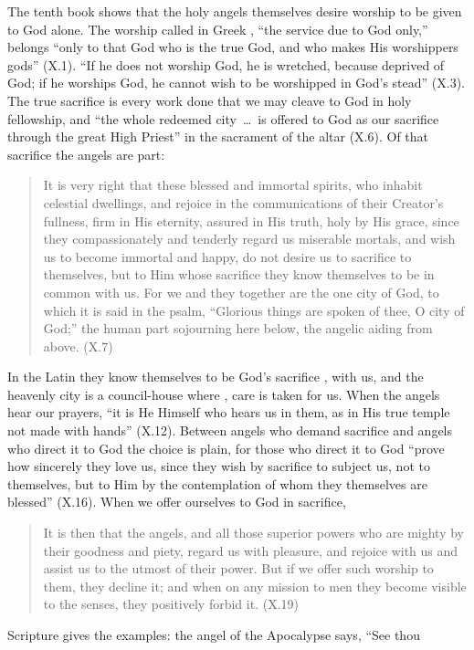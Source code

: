The tenth book shows that the holy angels themselves desire worship to be
given to God alone. The worship called in Greek , ``the
service due to God only,'' belongs ``only to that God who is the true God,
and who makes His worshippers gods'' (X.1). ``If he does not
worship God, he is wretched, because deprived of God; if he worships God,
he cannot wish to be worshipped in God's stead'' (X.3). The true
sacrifice is every work done that we may cleave to God in holy
fellowship, and ``the whole redeemed city~\dots\ is offered to God as our
sacrifice through the great High Priest'' in the sacrament of the altar
(X.6). Of that sacrifice the angels are part:
\begin{quote}
It is very right that these blessed and immortal spirits, who inhabit
celestial dwellings, and rejoice in the communications of their Creator's
fullness, firm in His eternity, assured in His truth, holy by His grace,
since they compassionately and tenderly regard us miserable mortals, and
wish us to become immortal and happy, do not desire us to sacrifice to
themselves, but to Him whose sacrifice they know themselves to be in
common with us. For we and they together are the one city of God, to which
it is said in the psalm, ``Glorious things are spoken of thee, O city of
God;'' the human part sojourning here below, the angelic aiding from
above. (X.7)
\end{quote}
In the Latin they know themselves to be God's sacrifice ,
with us, and the heavenly city is a council-house where , care is taken for us. When the angels hear our
prayers, ``it is He Himself who hears us in them, as in His true temple
not made with hands'' (X.12). Between angels who demand sacrifice and
angels who direct it to God the choice is plain, for those who direct it
to God ``prove how sincerely they love us, since they wish by sacrifice to
subject us, not to themselves, but to Him by the contemplation of whom
they themselves are blessed'' (X.16). When we offer
ourselves to God in sacrifice,
\begin{quote}
It is then that the angels, and all those superior powers who are mighty
by their goodness and piety, regard us with pleasure, and rejoice with us
and assist us to the utmost of their power. But if we offer such worship
to them, they decline it; and when on any mission to men they become
visible to the senses, they positively forbid it. (X.19)
\end{quote}
Scripture gives the examples: the angel of the Apocalypse says, ``See thou
